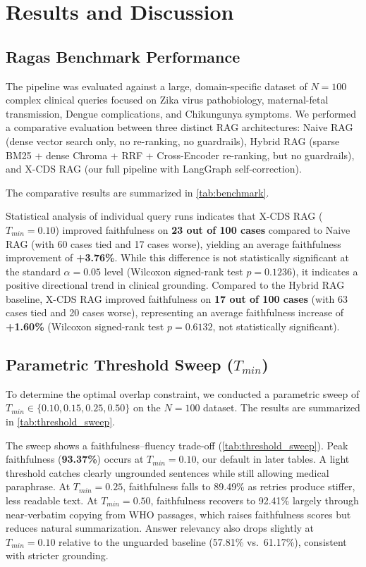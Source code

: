\section{Results and Discussion}\label{sec:results}

\subsection{Ragas Benchmark Performance}
The pipeline was evaluated against a large, domain-specific dataset of $N=100$ complex clinical queries focused on Zika virus pathobiology, maternal-fetal transmission, Dengue complications, and Chikungunya symptoms. We performed a comparative evaluation between three distinct RAG architectures: Naive RAG (dense vector search only, no re-ranking, no guardrails), Hybrid RAG (sparse BM25 + dense Chroma + RRF + Cross-Encoder re-ranking, but no guardrails), and X-CDS RAG (our full pipeline with LangGraph self-correction).

The comparative results are summarized in \cref{tab:benchmark}.



Statistical analysis of individual query runs indicates that X-CDS RAG ($T_{min}=0.10$) improved faithfulness on \textbf{23 out of 100 cases} compared to Naive RAG (with 60 cases tied and 17 cases worse), yielding an average faithfulness improvement of \textbf{+3.76\%}. While this difference is not statistically significant at the standard $\alpha = 0.05$ level (Wilcoxon signed-rank test $p = 0.1236$), it indicates a positive directional trend in clinical grounding. Compared to the Hybrid RAG baseline, X-CDS RAG improved faithfulness on \textbf{17 out of 100 cases} (with 63 cases tied and 20 cases worse), representing an average faithfulness increase of \textbf{+1.60\%} (Wilcoxon signed-rank test $p = 0.6132$, not statistically significant).

\subsection{Parametric Threshold Sweep ($T_{min}$)}
To determine the optimal overlap constraint, we conducted a parametric sweep of $T_{min} \in \{0.10, 0.15, 0.25, 0.50\}$ on the $N=100$ dataset. The results are summarized in \cref{tab:threshold_sweep}.



The sweep shows a faithfulness--fluency trade-off (\cref{tab:threshold_sweep}). Peak faithfulness (\textbf{93.37\%}) occurs at $T_{min}=0.10$, our default in later tables. A light threshold catches clearly ungrounded sentences while still allowing medical paraphrase. At $T_{min}=0.25$, faithfulness falls to 89.49\% as retries produce stiffer, less readable text. At $T_{min}=0.50$, faithfulness recovers to 92.41\% largely through near-verbatim copying from WHO passages, which raises faithfulness scores but reduces natural summarization. Answer relevancy also drops slightly at $T_{min}=0.10$ relative to the unguarded baseline (57.81\% vs.\ 61.17\%), consistent with stricter grounding.

